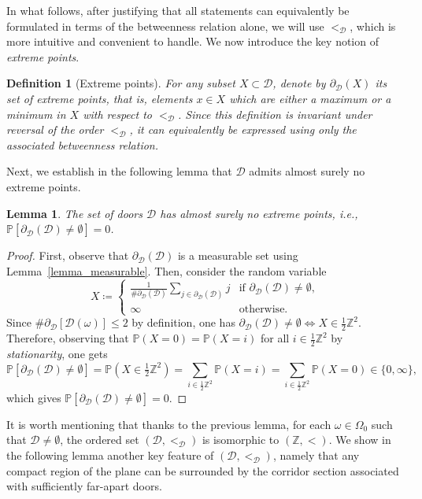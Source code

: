 \documentclass[a4paper, 11pt]{article} %
\theoremstyle{plain}
\newtheorem{lemma}[theorem]{Lemma}
\newtheorem{definition}[theorem]{Definition}
\newcommand{\D}{\mathcal D}
\newcommand{\Z}{\mathbb{Z}}
\newcommand{\1}{\mathds 1}
\renewcommand{\P}{\mathbb{P}}
\numberwithin{equation}{section}
\begin{document}
In what follows, after justifying that all statements can equivalently be formulated in terms of the betweenness relation alone, we will use $<_\D$, which is more intuitive and convenient to handle. We now introduce the key notion of \emph{extreme points}.


\begin{definition}[Extreme points]
    For any subset $X\subset\D$, denote by $\partial_{\D}(X)$ its set of extreme points, that is, elements $x\in X$ which are either a maximum or a minimum in $X$ with respect to $<_\D$. Since this definition is invariant under reversal of the order $<_\D$, it can equivalently be expressed using only the associated betweenness relation.
\end{definition}


Next, we establish in the following lemma that $\D$ admits almost surely no extreme points.


\begin{lemma}
    \label{lemma_no_extremes}
    The set of doors $\D$ has almost surely no extreme points, i.e., $\P[\partial_\D(\D)\neq\emptyset]=0$.
\end{lemma}

\begin{proof}
    First, observe that $\partial_\D(\D)$ is a measurable set using Lemma~\ref{lemma_measurable}. Then, consider the random variable
        \[X\coloneqq\begin{cases}
            \frac1{\#\partial_\D(\D)}\sum_{j\in\partial_\D(\D)}j &\text{if $\partial_\D(\D)\neq\emptyset$,}\\
            \infty &\text{otherwise}.
        \end{cases}\]
    Since $\#\partial_\D[\D(\omega)]\leq 2$ by definition, one has $\partial_\D(\D)\neq\emptyset\iff X\in\frac12\Z^2$. Therefore, observing that $\P(X=0)=\P(X=i)$ for all $i\in\frac12\Z^2$ by \emph{stationarity}, one gets
        \[\P[\partial_\D(\D)\neq\emptyset]=\P(X\in\tfrac12\Z^2)=\sum_{i\in\frac12\Z^2}\P(X=i)=\sum_{i\in\frac12\Z^2}\P(X=0)\in\{0,\infty\},\]
    which gives $\P[\partial_\D(\D)\neq\emptyset]=0$.
\end{proof}


It is worth mentioning that thanks to the previous lemma, for each $\omega\in\Omega_0$ such that $\D\neq\emptyset$, the ordered set $(\D,<_\D)$ is isomorphic to $(\Z,<)$. We show in the following lemma another key feature of $(\D,<_\D)$, namely that any compact region of the plane can be surrounded by the corridor section associated with sufficiently far-apart doors.
\end{document}

